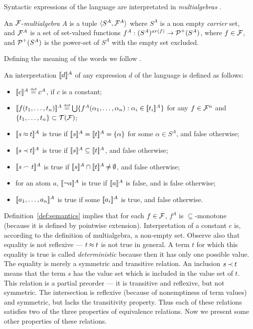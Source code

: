 Syntactic expressions of the language are interpretated in {\em multialgebras}
\cite{Kap,Hus,Mich}.
\begin{DEFINITION}
An $\Funcs$-{\em multialgebra} $A$ is a tuple \(\<S^A,\Funcs^A\>\) where $S^A$
is a non empty {\em carrier} set, and $\Funcs^A$ is a set of set-valued functions
\(f^A: (S^A)^{ar(f)}\to\C P^+(S^A)\), where \(f\in \Funcs\), and \(\C P^+(S^A)\)
is the power-set of \(S^A\) with the empty set excluded.
\end{DEFINITION}
Defining the meaning of the words we follow \cite{MW,Mich}.
\begin{DEFINITION} \label{def:semantics}
An interpretation
\(\Interpret d\) of any expression $d$ of the language is defined as follows: 
\begin{itemize}\MyLPar
\item \(\Interpret c \Def c^A\), if $c$ is a constant;
\item \(\Interpret{f(\List tn,)} \Def \bigcup\{f^A(\List\alpha n,):
  \alpha_i\in\Interpret {t_i}\}\) 
for any \(f\in \Funcs^n\) and \(\{\List
  tn,\}\subset \Terms\Funcs\);
\item \(\Interpret{s\Eq t}\) is true if \(\Interpret s=\Interpret
  t=\{\alpha\}\) for some $\alpha\in S^A$, and false otherwise;
\item \(\Interpret{s\Incl t}\) is true if \(\Interpret s\subseteq\Interpret
  t\), and false otherwise;
\item \(\Interpret{s\Int t}\) is true if \(\Interpret s\cap \Interpret
  t \Not = \es\), and false otherwise;
\item for an atom $a$, \(\Interpret{\neg a}\) is true if \(\Interpret{a}\) 
 is false, and is false otherwise;
\item \(\Interpret{\List an,}\) is true if some
  \(\Interpret{a_i}\) is true, and false otherwise.
\end{itemize}
\end{DEFINITION}
Definition~\ref {def:semantics} implies that for each \(f\in \Funcs\), \(f^A\)
is \(\subseteq\)-monotone (because it is defined by pointwise extension).
Interpretation of a constant $c$ is, according to the definition of
multialgebra, a non-empty set. Observe also that equality is not reflexive ---
\(t\Eq t\) is not true in general. A term $t$ for which this equality is true
is called {\em deterministic} because then it has only one possible value. The
equality is merely a symmetric and transitive relation. An inclusion \(s\Incl
t\) means that the term $s$ has the value set which is included in the value
set of $t$. This relation is a partial preorder --- it is transitive and
reflexive, but not symmetric. The intersection is reflexive (because of
nonemptiness of term values) and symmetric, but lacks the transitivity
property. Thus each of these relations satisfies two of the three properties
of equivalence relations.  Now we present some other properties of these
relations.\\[8pt]

